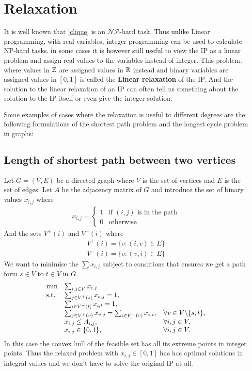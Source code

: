 \section{Relaxation}
It is well known that \ref{clique} is an $\mathcal{NP}$-hard task. Thus unlike Linear programming, with real variables, integer programming can be used to calculate NP-hard tasks. in some cases it is however still useful to view the IP as a linear problem and assign real values to the variables instead of integer. This problem, where values in $\mathbb{Z}$ are assigned values in $\mathbb{R}$ instead and binary variables are assigned values in $[0,1]$ is called the \textbf{Linear relaxation} of the IP. And the solution to the linear relaxation of an IP can often tell us something about the solution to the IP itself or even give the integer solution.
\begin{example}
Some examples of cases where the relaxation is useful to different degrees are the following formulations of the shortest path problem and the longest cycle problem in graphs:
\subsection{Length of shortest path between two vertices}
Let $G=(V,E)$ be a directed graph where $V$ is the set of vertices and $E$ is the set of edges. Let $A$ be the adjacency matrix of $G$ and introduce the set of binary values $x_{i,j}$ where
\begin{align*}
x_{i,j} = \left\{
\begin{array}{ll}
1 & \text{if } (i,j) \text{ is in the path} \\ 0 & \text{otherwise}
\end{array}\right.
\end{align*}
And the sets $V^+(i)$ and $V^-(i)$ where
\begin{align*}
V^+(i) = \{v: (i,v) \in E\}\\
V^-(i) = \{v: (v, i) \in E\}
\end{align*}
We want to minimise the $\sum x_{i,j}$ subject to conditions that ensures we get a path form $s \in V$ to $t \in V$ in $G$.
\begin{align}
\begin{array}{ll@{}ll}
\text{min} &\sum_{i,j \in V}x_{i,j}&\\
\text{s.t.} &\sum_{j\in V^+(s)}x_{s,j} = 1,&\\
&\sum_{i\in V^-(t)}x_{i,t} = 1,&\\
&\sum_{j\in V^+(v)}x_{v,j} = \sum_{i\in V^-(v)}x_{i,v}, \quad &\forall v \in V \backslash \{s,t\},\\
&x_{i,j}\leq A_{i,j},&\forall i,j \in V,\\
&x_{i,j} \in \{0,1\},&\forall i,j \in V.\\
\end{array}
\end{align}
In this case the convex hull of the feasible set has all its extreme points in integer points. Thus the relaxed problem with $x_{i,j} \in [0,1]$ has has optimal solutions in integral values and we don't have to solve the original IP at all.

\end{example}
